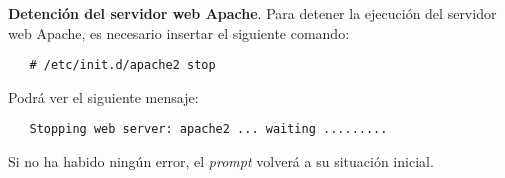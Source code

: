 \item \textbf{Detención del servidor web Apache}.
   Para detener la ejecución del servidor web Apache, es necesario insertar
   el siguiente comando:

   \begin{verbatim}
   # /etc/init.d/apache2 stop
   \end{verbatim}

   Podrá ver el siguiente mensaje:

   \begin{verbatim}
   Stopping web server: apache2 ... waiting .........
   \end{verbatim}

   Si no ha habido ningún error, el \textit{prompt} volverá a su situación
   inicial.
